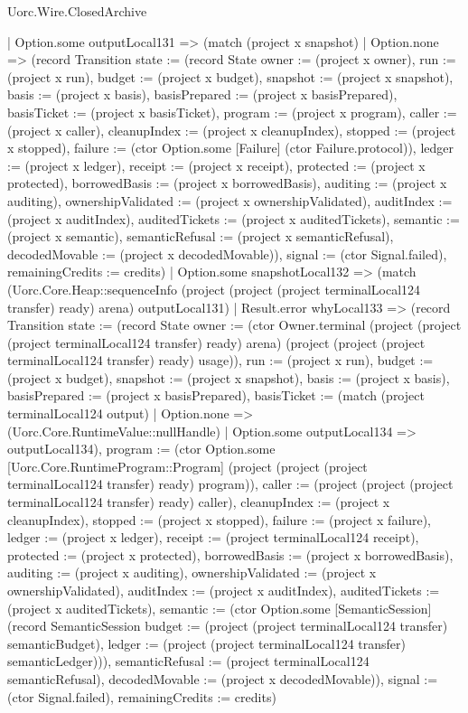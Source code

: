 \begin{lexlean}{Uorc.Wire.ClosedArchive}
\begin{semanticmodule}
{            | Option.some outputLocal131 => (match (project x snapshot)
              | Option.none => (record Transition {state := (record State {owner := (project x owner), run := (project x run), budget := (project x budget), snapshot := (project x snapshot), basis := (project x basis), basisPrepared := (project x basisPrepared), basisTicket := (project x basisTicket), program := (project x program), caller := (project x caller), cleanupIndex := (project x cleanupIndex), stopped := (project x stopped), failure := (ctor Option.some [Failure] (ctor Failure.protocol)), ledger := (project x ledger), receipt := (project x receipt), protected := (project x protected), borrowedBasis := (project x borrowedBasis), auditing := (project x auditing), ownershipValidated := (project x ownershipValidated), auditIndex := (project x auditIndex), auditedTickets := (project x auditedTickets), semantic := (project x semantic), semanticRefusal := (project x semanticRefusal), decodedMovable := (project x decodedMovable)}), signal := (ctor Signal.failed), remainingCredits := credits})
              | Option.some snapshotLocal132 => (match (Uorc.Core.Heap::sequenceInfo (project (project (project terminalLocal124 transfer) ready) arena) outputLocal131)
                | Result.error whyLocal133 => (record Transition {state := (record State {owner := (ctor Owner.terminal (project (project (project terminalLocal124 transfer) ready) arena) (project (project (project terminalLocal124 transfer) ready) usage)), run := (project x run), budget := (project x budget), snapshot := (project x snapshot), basis := (project x basis), basisPrepared := (project x basisPrepared), basisTicket := (match (project terminalLocal124 output)
                  | Option.none => (Uorc.Core.RuntimeValue::nullHandle)
                  | Option.some outputLocal134 => outputLocal134), program := (ctor Option.some [Uorc.Core.RuntimeProgram::Program] (project (project (project terminalLocal124 transfer) ready) program)), caller := (project (project (project terminalLocal124 transfer) ready) caller), cleanupIndex := (project x cleanupIndex), stopped := (project x stopped), failure := (project x failure), ledger := (project x ledger), receipt := (project terminalLocal124 receipt), protected := (project x protected), borrowedBasis := (project x borrowedBasis), auditing := (project x auditing), ownershipValidated := (project x ownershipValidated), auditIndex := (project x auditIndex), auditedTickets := (project x auditedTickets), semantic := (ctor Option.some [SemanticSession] (record SemanticSession {budget := (project (project terminalLocal124 transfer) semanticBudget), ledger := (project (project terminalLocal124 transfer) semanticLedger)})), semanticRefusal := (project terminalLocal124 semanticRefusal), decodedMovable := (project x decodedMovable)}), signal := (ctor Signal.failed), remainingCredits := credits})
}
\end{semanticmodule}
\end{lexlean}
